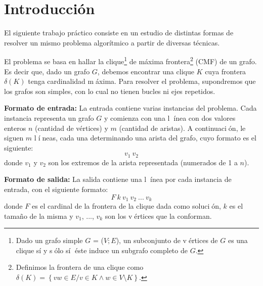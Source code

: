 \documentclass[10pt, a4paper]{article}
\author{Algoritmos y Estructuras de Datos III, DC, UBA.}
\date{}
\title{}
\begin{document}
	
\thispagestyle{empty}
\titulo{}

\maketitle

\tableofcontents
\newpage

\section{Introducci\'on}
El siguiente trabajo práctico consiste en un estudio de distintas formas de resolver un mismo problema algorítmico a partir de diversas técnicas.

El problema se basa en hallar la clique\footnote{Dado un grafo simple $G$ = ($V;E$), un subconjunto de vértices de $G$ es una clique sí y sólo sí éste induce un subgrafo completo de $G$.} de máxima frontera\footnote{Definimos la frontera de una clique como $\delta(K) = \left \{ vw \in E / v \in K \land w \in V \setminus K \right \}$.} (CMF) de un grafo. Es decir que, dado un grafo $G$, debemos encontrar una clique $K$ cuya frontera $\delta(K)$ tenga cardinalidad máxima. Para resolver el problema, supondremos que los grafos son simples, con lo cual no tienen bucles ni ejes repetidos.


\textbf{Formato de entrada:}
La entrada contiene varias instancias del problema. Cada instancia representa un grafo $G$ y comienza con una línea con dos valores enteros $n$ (cantidad de vértices) y $m$ (cantidad de aristas). A continuación, le siguen $m$ líneas, cada una determinando una arista del grafo, cuyo formato es el siguiente:
$$v_{1}\ v_{2}$$
donde $v_{1}$ y $v_{2}$ son los extremos de la arista representada (numerados de 1 a $n$).

\textbf{Formato de salida:} 
La salida contiene una línea por cada instancia de entrada, con el siguiente formato:
$$F\ k\ v_{1}\ v_{2}\ ...\ v_{k}$$
donde $F$ es el cardinal de la frontera de la clique dada como solución, $k$ es el tamaño de la misma y $v_{1}$, ..., $v_{k}$ son los vértices que la conforman.\newline
\end{document}
